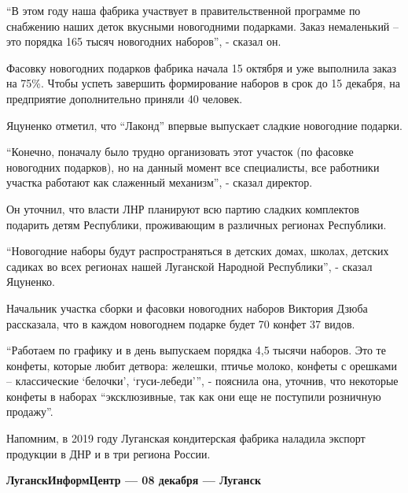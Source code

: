 \enquote{В этом году наша фабрика участвует в правительственной программе по снабжению
наших деток вкусными новогодними подарками. Заказ немаленький – это порядка 165
тысяч новогодних наборов}, - сказал он.

Фасовку новогодних подарков фабрика начала 15 октября и уже выполнила заказ на
75\%. Чтобы успеть завершить формирование наборов в срок до 15 декабря, на
предприятие дополнительно приняли 40 человек.

Яцуненко отметил, что \enquote{Лаконд} впервые выпускает сладкие новогодние подарки.

\enquote{Конечно, поначалу было трудно организовать этот участок (по фасовке новогодних
подарков), но на данный момент все специалисты, все работники участка работают
как слаженный механизм}, - сказал директор.

Он уточнил, что власти ЛНР планируют всю партию сладких комплектов подарить
детям Республики, проживающим в различных регионах Республики.

\enquote{Новогодние наборы будут распространяться в детских домах, школах, детских
садиках во всех регионах нашей Луганской Народной Республики}, - сказал
Яцуненко.

Начальник участка сборки и фасовки новогодних наборов Виктория Дзюба
рассказала, что в каждом новогоднем подарке будет 70 конфет 37 видов.

\enquote{Работаем по графику и в день выпускаем порядка 4,5 тысячи наборов. Это те
конфеты, которые любит детвора: желешки, птичье молоко, конфеты с орешками –
классические \enquote{белочки}, \enquote{гуси-лебеди}}, - пояснила она, уточнив, что некоторые
конфеты в наборах \enquote{эксклюзивные, так как они еще не поступили розничную
продажу}.

Напомним, в 2019 году Луганская кондитерская фабрика наладила экспорт продукции
в ДНР и в три региона России.

\textbf{ЛуганскИнформЦентр — 08 декабря — Луганск}

